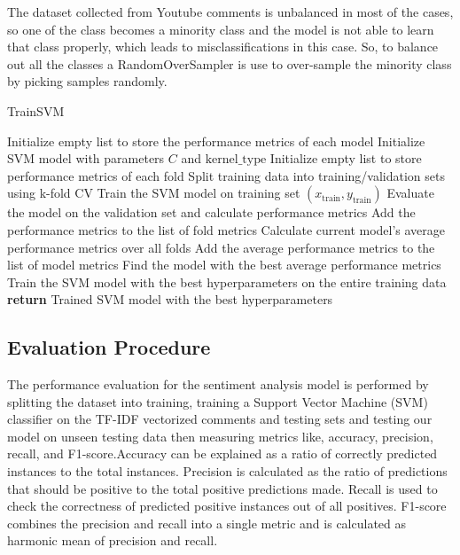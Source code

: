 \documentclass[11pt,article,oneside]{article}
\begin{document}
The dataset collected from Youtube comments is unbalanced in most of the cases, so one of the class becomes a minority class and the model is not able to learn that class properly, which leads to misclassifications in this case. So, to balance out all the classes a RandomOverSampler\citep{vaderUsage} is use to over-sample the minority class by picking samples randomly.
\begin{algorithm}
\caption{TrainSVM}
\begin{algorithmic}[1]
        \State Initialize empty list to store the performance metrics of each model
                \State Initialize SVM model with parameters $C$ and $\text{kernel\_type}$
                \State Initialize empty list to store performance metrics of each fold
                    \State Split training data into training/validation sets using k-fold CV
                    \State Train the SVM model on training set $(x_{\text{train}}, y_{\text{train}})$
                    \State Evaluate the model on the validation set and calculate performance metrics
                    \State Add the performance metrics to the list of fold metrics
                \EndFor
                \State Calculate current model's average performance metrics over all folds
                \State Add the average performance metrics to the list of model metrics
            \EndFor
        \EndFor
        \State Find the model with the best average performance metrics
        \State Train the SVM model with the best hyperparameters on the entire training data
        \State \textbf{return} Trained SVM model with the best hyperparameters
    \EndProcedure
\end{algorithmic}
\end{algorithm}

\subsection{Evaluation Procedure}
The performance evaluation for the sentiment analysis model is performed by splitting the dataset into training, training a Support Vector Machine (SVM) classifier on the TF-IDF vectorized comments\citep{kilmen2022text} and testing sets and testing our model on unseen testing data then measuring metrics like, accuracy, precision, recall, and F1-score.Accuracy can be explained as a ratio of correctly predicted instances to the total instances. Precision is calculated as the ratio of predictions that should be positive  to the total positive predictions made. Recall is used to check the correctness of predicted positive instances out of all positives. F1-score combines the precision and recall into a single metric and is calculated as harmonic mean of precision and recall.
\end{document}
